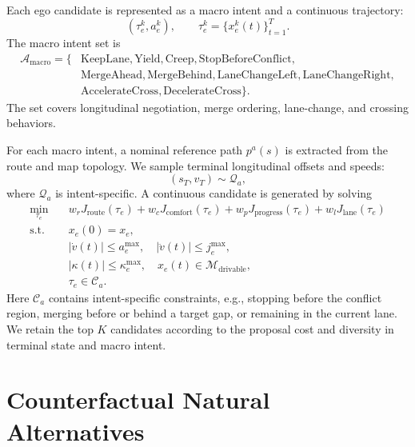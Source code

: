\documentclass[10pt]{article}
\begin{document}
Each ego candidate is represented as a macro intent and a continuous trajectory:
\begin{equation}
    (\tau^k_e,a^k_e), \qquad
    \tau^k_e=\{x^k_e(t)\}_{t=1}^{T}.
\end{equation}
The macro intent set is
\begin{equation}
\begin{aligned}
    \mathcal{A}_{\mathrm{macro}}
    =
    \{
    &\mathrm{KeepLane},
    \mathrm{Yield},
    \mathrm{Creep},
    \mathrm{StopBeforeConflict},\\
    &\mathrm{MergeAhead},
    \mathrm{MergeBehind},
    \mathrm{LaneChangeLeft},
    \mathrm{LaneChangeRight},\\
    &\mathrm{AccelerateCross},
    \mathrm{DecelerateCross}
    \}.
\end{aligned}
\end{equation}
The set covers longitudinal negotiation, merge ordering, lane-change, and crossing behaviors.

For each macro intent, a nominal reference path $p^a(s)$ is extracted from the route and map topology. We sample terminal longitudinal offsets and speeds:
\begin{equation}
    (s_T,v_T)\sim \mathcal{Q}_a,
\end{equation}
where $\mathcal{Q}_a$ is intent-specific. A continuous candidate is generated by solving
\begin{equation}
\begin{aligned}
    \min_{\tau_e}\quad
    &
    w_r J_{\mathrm{route}}(\tau_e)
    +
    w_c J_{\mathrm{comfort}}(\tau_e)
    +
    w_p J_{\mathrm{progress}}(\tau_e)
    +
    w_l J_{\mathrm{lane}}(\tau_e) \\
    \mathrm{s.t.}\quad
    &
    x_e(0)=x_e, \\
    &
    |\dot{v}(t)|\le a^{\max}_e,\quad
    |\ddot{v}(t)|\le j^{\max}_e,\\
    &
    |\kappa(t)|\le \kappa^{\max}_e,\quad
    x_e(t)\in\mathcal{M}_{\mathrm{drivable}},\\
    &
    \tau_e \in \mathcal{C}_a .
\end{aligned}
\end{equation}
Here $\mathcal{C}_a$ contains intent-specific constraints, e.g., stopping before the conflict region, merging before or behind a target gap, or remaining in the current lane. We retain the top $K$ candidates according to the proposal cost and diversity in terminal state and macro intent.

\section{Counterfactual Natural Alternatives}
\label{app:natural_alternatives}
\end{document}
